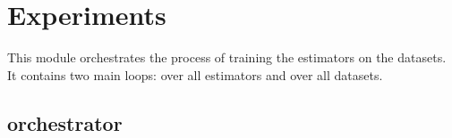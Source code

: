 \documentclass[letterpaper,10pt,english]{sphinxmanual}
\begin{document}
\section{Experiments}
\label{\detokenize{experiments:id1}}\label{\detokenize{experiments::doc}}\label{\detokenize{experiments:experiments}}
This module orchestrates the process of training the estimators on the datasets. It contains two main loops: over all estimators and over all datasets.


\subsection{orchestrator}
\label{\detokenize{experiments:module-mleap.experiments.orchestrator}}\label{\detokenize{experiments:orchestrator}}
\end{document}
